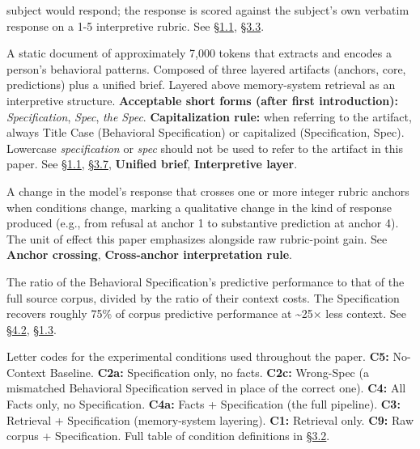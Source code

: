 \begin{description}
subject would respond; the response is scored against the subject's own
verbatim response on a 1-5 interpretive rubric. See \hyperref[recall-is-not-interpretation.-interpretation-can-be-measured.]{§1.1}, \hyperref[scoring-rubric-with-calibrated-llm-judge-panel]{§3.3}.
\item[Behavioral Specification]
A static document of approximately 7,000 tokens that extracts and
encodes a person's behavioral patterns. Composed of three layered
artifacts (anchors, core, predictions) plus a unified brief. Layered
above memory-system retrieval as an interpretive structure.
\textbf{Acceptable short forms (after first introduction):}
\emph{Specification}, \emph{Spec}, \emph{the Spec}.
\textbf{Capitalization rule:} when referring to the artifact, always
Title Case (Behavioral Specification) or capitalized (Specification,
Spec). Lowercase \emph{specification} or \emph{spec} should not be used
to refer to the artifact in this paper. See \hyperref[recall-is-not-interpretation.-interpretation-can-be-measured.]{§1.1}, \hyperref[pipeline-for-the-behavioral-specification]{§3.7}, \textbf{Unified
brief}, \textbf{Interpretive layer}.
\item[Categorical shift]
A change in the model's response that crosses one or more integer rubric
anchors when conditions change, marking a qualitative change in the kind
of response produced (e.g., from refusal at anchor 1 to substantive
prediction at anchor 4). The unit of effect this paper emphasizes
alongside raw rubric-point gain. See \textbf{Anchor crossing},
\textbf{Cross-anchor interpretation rule}.
\item[Compression / Compression ratio]
The ratio of the Behavioral Specification's predictive performance to
that of the full source corpus, divided by the ratio of their context
costs. The Specification recovers roughly 75\% of corpus predictive
performance at \textasciitilde25× less context. See \hyperref[compression-structure-vs.-raw-text]{§4.2}, \hyperref[what-we-found]{§1.3}.
\item[Condition codes (C1-C9)]
Letter codes for the experimental conditions used throughout the paper.
\textbf{C5:} No-Context Baseline. \textbf{C2a:} Specification only, no
facts. \textbf{C2c:} Wrong-Spec (a mismatched Behavioral Specification
served in place of the correct one). \textbf{C4:} All Facts only, no
Specification. \textbf{C4a:} Facts + Specification (the full pipeline).
\textbf{C3:} Retrieval + Specification (memory-system layering).
\textbf{C1:} Retrieval only. \textbf{C9:} Raw corpus + Specification.
Full table of condition definitions in \hyperref[experimental-conditions]{§3.2}.

\end{description}
